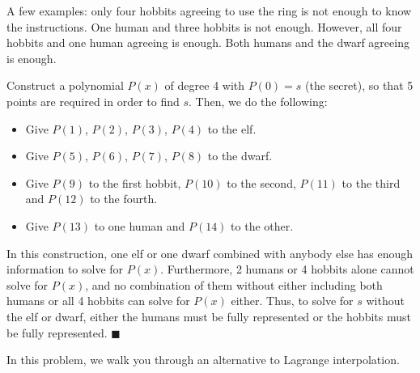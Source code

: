 \documentclass[11pt]{article}
\begin{document}
A few examples: only four hobbits agreeing to use the ring is not enough to know the instructions. One human and three hobbits is not enough. However, all four hobbits and one human agreeing is enough. Both humans and the dwarf agreeing is enough.

\begin{solution}
    Construct a polynomial $P(x)$ of degree 4 with $P(0) = s$ (the secret), so that 5 points are required in order to find $s$. Then, we do the following:

    \begin{itemize}
        \item Give $P(1)$, $P(2)$, $P(3)$, $P(4)$ to the elf.
        \item Give $P(5)$, $P(6)$, $P(7)$, $P(8)$ to the dwarf.
        \item Give $P(9)$ to the first hobbit, $P(10)$ to the second, $P(11)$ to the third and $P(12)$ to the fourth.
        \item Give $P(13)$ to one human and $P(14)$ to the other.
    \end{itemize}
    
    In this construction, one elf or one dwarf combined with anybody else has enough information to solve for $P(x)$. Furthermore, 2 humans or 4 hobbits alone cannot solve for $P(x)$, and no combination of them without either including both humans or all 4 hobbits can solve for $P(x)$ either. Thus, to solve for $s$ without the elf or dwarf, either the humans must be fully represented or the hobbits must be fully represented. $\blacksquare$
\end{solution}

\pagebreak
{}  

In this problem, we walk you through an alternative to Lagrange interpolation.
\end{document}

